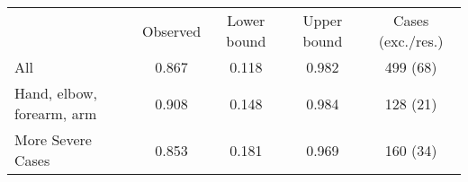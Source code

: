 \begin{tabular}{lcccc} \hline
                          &  Observed & Lower bound & Upper bound & Cases (exc./res.) \\
All                       & 0.867     & 0.118       & 0.982       & 499 (68)       \\
Hand, elbow, forearm, arm & 0.908     & 0.148       & 0.984       & 128 (21)        \\
More Severe Cases         & 0.853     & 0.181       & 0.969       & 160 (34)        \\ \hline
\end{tabular}